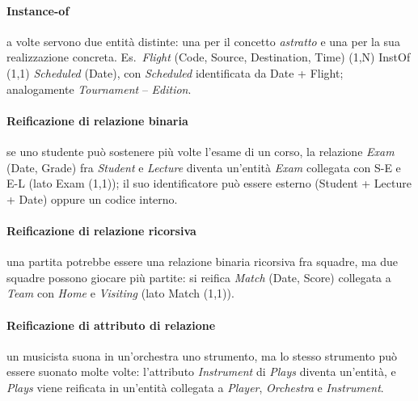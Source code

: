 \documentclass[a4paper,12pt]{article}
\begin{document}
\paragraph{Instance-of} a volte servono due entità distinte: una per il
concetto \emph{astratto} e una per la sua realizzazione concreta. Es.\
\emph{Flight} (Code, Source, Destination, Time) (1,N) InstOf (1,1)
\emph{Scheduled} (Date), con \emph{Scheduled} identificata da Date +
Flight; analogamente \emph{Tournament} -- \emph{Edition}.

\paragraph{Reificazione di relazione binaria} se uno studente può sostenere
più volte l'esame di un corso, la relazione \emph{Exam} (Date, Grade) fra
\emph{Student} e \emph{Lecture} diventa un'entità \emph{Exam} collegata con
S-E e E-L (lato Exam (1,1)); il suo identificatore può essere esterno
(Student + Lecture + Date) oppure un codice interno.
\begin{center}
\end{center}

\paragraph{Reificazione di relazione ricorsiva} una partita potrebbe essere una
relazione binaria ricorsiva fra squadre, ma due squadre possono giocare più
partite: si reifica \emph{Match} (Date, Score) collegata a \emph{Team} con
\emph{Home} e \emph{Visiting} (lato Match (1,1)).

\paragraph{Reificazione di attributo di relazione} un musicista suona in
un'orchestra uno strumento, ma lo stesso strumento può essere suonato molte
volte: l'attributo \emph{Instrument} di \emph{Plays} diventa un'entità, e
\emph{Plays} viene reificata in un'entità collegata a \emph{Player},
\emph{Orchestra} e \emph{Instrument}.
\end{document}
